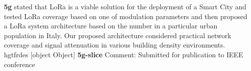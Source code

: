 
\newpage
{}
\onecolumn

\textbf{5g} \newline  \cite{polese_m2m_2016}   \citet{polese_m2m_2016} stated that LoRa is a viable solution for the deployment of a Smart City and tested LoRa coverage based on one of modulation parameters and then proposed a LoRa system architecture based on the number in a particular urban population in Italy. Our proposed architecture considered practical network coverage and signal attenuation in various building density environments.~   \newline 
 \cite{bouzouita_random_2015}   hgtfrdes   \newline 
 \cite{agiwal_next_2016}    \newline 
 \cite{aijaz_hap-slicer_2018}    \newline 
 \cite{alqahtani_multi-stage_2019}    \newline 
 \cite{bouzouita_estimating_2018}    \newline 
 \cite{bouzouita_multiple_2015}    \newline 
 \cite{buyya_management_2019}    \newline 
 \cite{doro_toward_2019}    \newline 
 \cite{ferrus_5g_2018}    \newline 
 \cite{ferrus_management_nodate}    \newline 
 \cite{gadallah_dynamic_2017}    \newline 
 \cite{hao_network_2018}    \newline 
 \cite{kazmi_network_2019}    \newline 
 \cite{kliks_reinforcement_2019}    \newline 
 \cite{kotulski_end--end_2017}    \newline 
 \cite{nakao_end--end_2017}    \newline 
 \cite{ojaghi_sliced-ran_2019}    \newline 
 \cite{othman_efficient_2019}    \newline 
 \cite{perez-romero_profit-based_2019}    \newline 
 \cite{sama_service-based_2016}    \newline 
 \cite{sun_user_2019}    \newline 
 \cite{yan_intelligent_2019}    \newline 
 \cite{doro_slice_2019}   [object Object]   \newline 
\textbf{5g-slice} \newline  \cite{sciancalepore_storns_2019}   Comment: Submitted for publication to IEEE conference   \newline 
